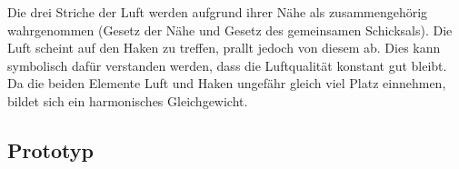 \documentclass[a4paper,10pt]{article}
\begin{document}
Die drei Striche der Luft werden aufgrund ihrer Nähe als zusammengehörig wahrgenommen (Gesetz der Nähe und Gesetz des gemeinsamen Schicksals). Die Luft scheint auf den Haken zu treffen, prallt jedoch von diesem ab. Dies kann symbolisch dafür verstanden werden, dass die Luftqualität konstant gut bleibt. Da die beiden Elemente Luft und Haken ungefähr gleich viel Platz einnehmen, bildet sich ein harmonisches Gleichgewicht.

\newpage



\subsection{Prototyp}

\begin{figure}[!h]
    \centering
    

\end{figure}
\end{document}
